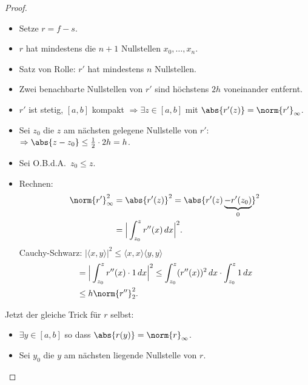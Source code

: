 \begin{proof}
\begin{itemize}
 \item Setze $r = f-s$.

 \item $r$ hat mindestens die $n+1$ Nullstellen $x_0, \dots, x_n$.

 \item Satz von Rolle: $r'$ hat mindestens $n$ Nullstellen.

 \item Zwei benachbarte Nullstellen von $r'$ sind höchstens $2h$ voneinander entfernt.

 \item $r'$ ist stetig, $[a, b]$ kompakt
     $\Rightarrow \exists z \in [a, b]$ mit $\abs{r'(z)} = \norm{r'}_\infty$.

 \item Sei $z_0$ die $z$ am nächsten gelegene Nullstelle von $r'$:\\
    $\Rightarrow \abs{z - z_0} \leq \frac{1}{2} \cdot 2 h = h$.

 \item Sei O.B.d.A.\ $z_0 \leq z$.

 \item Rechnen:
  \begin{align*}
   \norm{r'}^2_\infty
   & =
   \abs{r'(z)}^2 = \abs{r'(z) \underbrace{- r'(z_0)}_{0}}^2 \\
   & =
   \Big\lvert\int_{z_0}^z r''(x)\,dx \Big\rvert^2.
  \end{align*}
  \medskip
Cauchy-Schwarz: $\vert \langle x, y\rangle\vert^2 \leq \langle x,x\rangle\langle y,y\rangle$
  \begin{align}
   \nonumber
   & =
   \Big\lvert\int_{z_0}^z r''(x) \cdot 1 \,dx \Big\rvert^2
   \leq
   \int_{z_0}^z (r''(x))^2\,dx \cdot \int_{z_0}^z 1\,dx \\
   \label{eq:interpolation:bound_on_r_prime}
   & \leq
   h \norm{r''}_2^2.
  \end{align}
\end{itemize}

Jetzt der gleiche Trick für $r$ selbst:

\begin{itemize}
 \item $\exists y \in [a,b]$ so dass $\abs{r(y)} = \norm{r}_\infty$.

 \item Sei $y_0$ die $y$ am nächsten liegende Nullstelle von $r$.


\end{itemize}
\end{proof}
